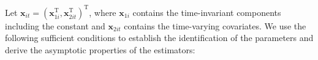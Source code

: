 \documentclass[12pt]{article}
\def\T{{ \mathrm{\scriptscriptstyle T} }}
\def\thetavec{\bm{\theta}}
\def\phivec{\bm{\phi}}
\def\aa{\bm{\alpha}_N}
\def\xx{\bm{x}}
\def\G{\bm{G}}
\def\H{\bm{H}}
\def\O{\bm{\Omega}}
\begin{document}


Let $\xx_{it} = (\xx_{1i}^\T,\xx_{2it}^\T)^\T$, where $\xx_{1i}$ contains the time-invariant components including the constant and $\xx_{2it}$ contains the time-varying covariates.  We use the following sufficient conditions to establish the identification of the parameters and derive the asymptotic properties of the estimators:
\end{document}
